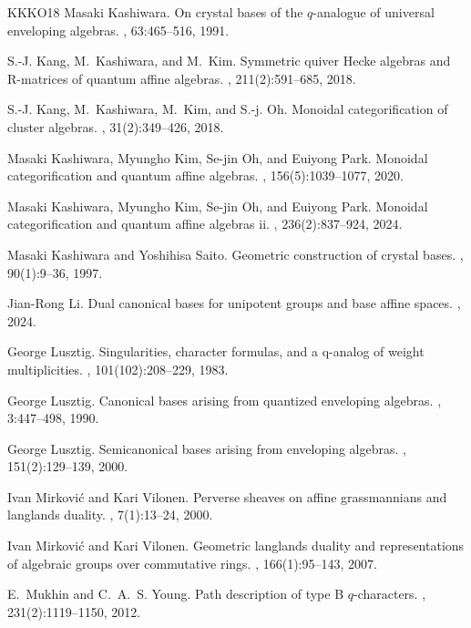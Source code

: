 \documentclass[12pt]{amsart}
\theoremstyle{plain}
\theoremstyle{definition}
\numberwithin{equation}{section}
\begin{document}
\begin{thebibliography}{KKKO18}
Masaki Kashiwara.
\newblock On crystal bases of the $q$-analogue of universal enveloping
  algebras.
, 63:465--516, 1991.

S.-J. Kang, M.~Kashiwara, and M.~Kim.
\newblock Symmetric quiver {H}ecke algebras and {R}-matrices of quantum affine
  algebras.
, 211(2):591--685, 2018.

S.-J. Kang, M.~Kashiwara, M.~Kim, and S.-j. Oh.
\newblock Monoidal categorification of cluster algebras.
, 31(2):349--426, 2018.

Masaki Kashiwara, Myungho Kim, Se-jin Oh, and Euiyong Park.
\newblock Monoidal categorification and quantum affine algebras.
, 156(5):1039--1077, 2020.

Masaki Kashiwara, Myungho Kim, Se-jin Oh, and Euiyong Park.
\newblock Monoidal categorification and quantum affine algebras ii.
, 236(2):837--924, 2024.

Masaki Kashiwara and Yoshihisa Saito.
\newblock Geometric construction of crystal bases.
, 90(1):9--36, 1997.

Jian-Rong Li.
\newblock Dual canonical bases for unipotent groups and base affine spaces.
, 2024.

George Lusztig.
\newblock Singularities, character formulas, and a q-analog of weight
  multiplicities.
, 101(102):208--229, 1983.

George Lusztig.
\newblock Canonical bases arising from quantized enveloping algebras.
, 3:447--498, 1990.

George Lusztig.
\newblock Semicanonical bases arising from enveloping algebras.
, 151(2):129--139, 2000.

Ivan Mirkovi{\'c} and Kari Vilonen.
\newblock Perverse sheaves on affine grassmannians and langlands duality.
, 7(1):13--24, 2000.

Ivan Mirkovi{\'c} and Kari Vilonen.
\newblock Geometric langlands duality and representations of algebraic groups
  over commutative rings.
, 166(1):95--143, 2007.

E.~Mukhin and C.~A.~S. Young.
\newblock Path description of type {B} {$q$}-characters.
, 231(2):1119--1150, 2012.

\end{thebibliography}
\end{document}
